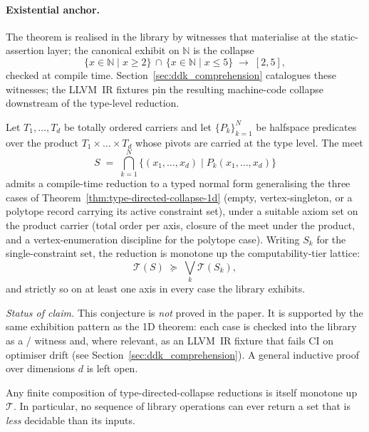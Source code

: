 \documentclass[11pt, a4paper]{article}
\begin{document}
\paragraph{Existential anchor.}
The theorem is realised in the library by witnesses that
materialise at the static-assertion layer; the canonical exhibit on
$\mathbb{N}$ is the collapse
\[
  \{x \in \mathbb{N} \mid x \ge 2\} \,\cap\, \{x \in \mathbb{N} \mid x \le 5\}
  \;\longrightarrow\;
  [2, 5],
\]
checked at compile time. Section~\ref{sec:ddk_comprehension} catalogues these
witnesses; the LLVM~IR fixtures pin the resulting machine-code
collapse downstream of the type-level reduction.

\begin{conjecture}
\label{conj:type-directed-collapse-nd}
Let $T_1, \dots, T_d$ be totally ordered carriers and let
$\{P_k\}_{k=1}^{N}$ be halfspace predicates over the product
$T_1 \times \dots \times T_d$ whose pivots are carried at the type
level. The meet
\[
  S \;=\; \bigcap_{k=1}^{N} \{(x_1, \dots, x_d) \mid P_k(x_1, \dots, x_d)\}
\]
admits a compile-time reduction to a typed normal form
generalising the three cases of
Theorem~\ref{thm:type-directed-collapse-1d} (empty, vertex-singleton,
or a polytope record carrying its active constraint set), under a
suitable axiom set on the product carrier (total order per axis,
closure of the meet under the product, and a vertex-enumeration
discipline for the polytope case). Writing $S_k$ for the
single-constraint set, the reduction is monotone up the
computability-tier lattice:
\[
  \mathcal{T}(S) \;\succeq\; \bigvee_{k} \mathcal{T}(S_k),
\]
and strictly so on at least one axis in every case the library
exhibits.

\smallskip
\noindent\emph{Status of claim.} This conjecture is \emph{not}
proved in the paper. It is supported by the same exhibition pattern
as the 1D theorem: each case is checked into the library as a
/ witness and,
where relevant, as an LLVM~IR fixture that fails CI on optimiser
drift (see Section~\ref{sec:ddk_comprehension}). A general inductive proof over
dimensions $d$ is left open.
\end{conjecture}

\begin{corollary}
\label{cor:iterated-collapse}
Any finite composition of type-directed-collapse reductions is itself
monotone up $\mathcal{T}$. In particular, no sequence of library
operations can ever return a set that is \emph{less} decidable than
its inputs.
\end{corollary}
\end{document}
